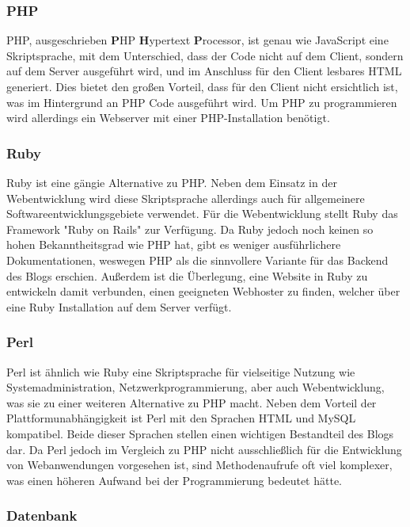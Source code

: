         \subsubsection*{PHP}
        {PHP\cite{php}, ausgeschrieben \textbf{P}HP \textbf{H}ypertext \textbf{P}rocessor, ist genau wie JavaScript eine Skriptsprache, mit dem Unterschied, dass der Code nicht auf dem Client, sondern auf dem Server ausgeführt wird,
        und im Anschluss für den Client lesbares HTML generiert. Dies bietet den großen Vorteil, dass für den Client nicht ersichtlich ist, was im Hintergrund an PHP Code ausgeführt
        wird. Um PHP zu programmieren wird allerdings ein Webserver mit einer PHP-Installation benötigt.

        \subsubsection*{Ruby}
        {Ruby\cite{ruby}} ist eine gängie Alternative zu PHP. Neben dem Einsatz in der Webentwicklung wird diese Skriptsprache allerdings auch für allgemeinere Softwareentwicklungsgebiete verwendet.
        Für die Webentwicklung stellt Ruby das Framework {"Ruby on Rails"\cite{rubyonrails}} zur Verfügung.
        Da Ruby jedoch noch keinen so hohen Bekanntheitsgrad wie PHP hat, gibt es weniger ausführlichere Dokumentationen, weswegen PHP als die sinnvollere Variante für das Backend des Blogs erschien.
        Außerdem ist die Überlegung, eine Website in Ruby zu entwickeln damit verbunden, einen geeigneten Webhoster zu finden, welcher über eine Ruby Installation auf dem Server verfügt.

        \subsubsection*{Perl}
        {Perl\cite{perl}} ist ähnlich wie Ruby eine Skriptsprache für vielseitige Nutzung wie Systemadministration, Netzwerkprogrammierung, aber auch Webentwicklung, was sie
        zu einer weiteren Alternative zu PHP macht. Neben dem Vorteil der Plattformunabhängigkeit ist Perl mit den Sprachen HTML und MySQL kompatibel. Beide dieser Sprachen stellen
        einen wichtigen Bestandteil des Blogs dar. Da Perl jedoch im Vergleich zu PHP nicht ausschließlich für die Entwicklung von Webanwendungen vorgesehen ist, sind
        Methodenaufrufe oft viel komplexer, was einen höheren Aufwand bei der Programmierung bedeutet hätte.

      \subsubsection*{Datenbank}

}
